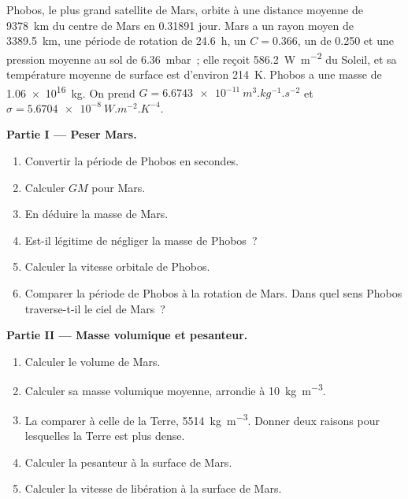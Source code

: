 \begin{problem}
\label{pb:b1:comparative-planetology:1}
Phobos, le plus grand satellite de Mars, orbite à une distance moyenne de
\qty{9378}{km} du centre de Mars en \num{0.31891} jour. Mars a un rayon moyen de
\qty{3389.5}{km}, une période de rotation de \qty{24.6}{h}, un  $C = 0.366$, un  de 0.250 et une pression moyenne
au sol de \qty{6.36}{mbar}~; elle reçoit \qty{586.2}{W.m^{-2}} du Soleil, et sa
température moyenne de surface est d'environ \qty{214}{K}. Phobos a une masse de
\qty{1.06e16}{kg}. On prend $G = \qty{6.6743e-11}{m^3.kg^{-1}.s^{-2}}$
et $\sigma = \qty{5.6704e-8}{W.m^{-2}.K^{-4}}$.

\medskip
\noindent\textbf{Partie I --- Peser Mars.}
\begin{enumerate}
  \item Convertir la période de Phobos en secondes.
  \item Calculer $GM$ pour Mars.
  \item En déduire la masse de Mars.
  \item Est-il légitime de négliger la masse de Phobos~?
  \item Calculer la vitesse orbitale de Phobos.
  \item Comparer la période de Phobos à la rotation de Mars. Dans quel sens
        Phobos traverse-t-il le ciel de Mars~?
\end{enumerate}

\medskip
\noindent\textbf{Partie II --- Masse volumique et pesanteur.}
\begin{enumerate}[resume]
  \item Calculer le volume de Mars.
  \item Calculer sa masse volumique moyenne, arrondie à \qty{10}{kg.m^{-3}}.
  \item La comparer à celle de la Terre, \qty{5514}{kg.m^{-3}}. Donner deux
        raisons pour lesquelles la Terre est plus dense.
  \item Calculer la pesanteur à la surface de Mars.
  \item Calculer la vitesse de libération à la surface de Mars.
\end{enumerate}


\end{problem}
